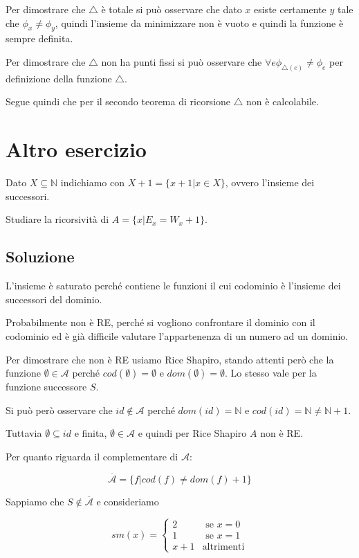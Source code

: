 Per dimostrare che $\bigtriangleup$ è totale si può osservare che dato $x$ esiste certamente $y$ tale che $\phi_x \neq \phi_y$, quindi l'insieme da minimizzare non è vuoto e quindi la funzione è sempre definita.

Per dimostrare che $\bigtriangleup$ non ha punti fissi si può osservare che $\forall e \phi_{\bigtriangleup(e)} \neq \phi_e$ per definizione della funzione $\bigtriangleup$.

Segue quindi che per il secondo teorema di ricorsione $\bigtriangleup$ non è calcolabile.

\section{Altro esercizio}

Dato $X \subseteq \mathbb{N}$ indichiamo con $X+1 = \{ x+1 | x \in X \}$, ovvero l'insieme dei successori.

Studiare la ricorsività di $A = \{ x | E_x = W_x +1 \}$.

\subsection{Soluzione}

L'insieme è saturato perché contiene le funzioni il cui codominio è l'insieme dei successori del dominio.

Probabilmente non è RE, perché si vogliono confrontare il dominio con il codominio ed è già difficile valutare l'appartenenza di un numero ad un dominio.

Per dimostrare che non è RE usiamo Rice Shapiro, stando attenti però che la funzione $\emptyset \in \mathcal{A}$ perché $cod(\emptyset) = \emptyset$ e $dom(\emptyset) = \emptyset$. Lo stesso vale per la funzione successore $S$.

Si può però osservare che $id \notin \mathcal{A}$ perché $dom(id) = \mathbb{N}$ e $cod(id) = \mathbb{N} \neq \mathbb{N} +1$.

Tuttavia $\emptyset \subseteq id$ e finita, $\emptyset \in \mathcal{A}$ e quindi per Rice Shapiro $A$ non è RE.

Per quanto riguarda il complementare di $\mathcal{A}$:

$$
\overline{\mathcal{A}} = \{ f | cod(f) \neq dom(f) +1 \}
$$

Sappiamo che $S \notin \overline{\mathcal{A}}$ e consideriamo

$$
sm(x) = \begin{cases}
	2 &\text{ se } x = 0 \\
	1 &\text{ se } x = 1 \\
	x+1 &\text{altrimenti}
\end{cases}
$$

